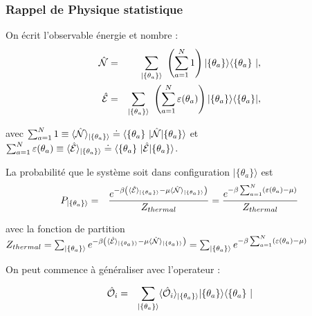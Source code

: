 \subsubsection{Rappel de Physique statistique}

On écrit l'observable énergie et nombre :
	\begin{eqnarray}
		\operator{\mathcal{N}} & = & \sum_{\vert \{\theta_a\} \rangle }   \left ( \sum_{a = 1}^N  1 \right )  \vert \{ \theta_a\}\rangle	\langle \{ \theta_a \} \vert,\\
		\operator{\mathcal{E}} & = & \sum_{ \vert \{ \theta_a\} \rangle }  \left ( \sum_{a = 1}^N  \varepsilon ( \theta_a ) \right )   \vert \{ \theta_a\}\rangle	\langle \{ \theta_a \}\vert,		
	\end{eqnarray}
	
	avec $\sum_{a = 1}^N 1 \equiv \langle \operator{\mathcal{N}} \rangle_{\vert \{\theta_a \} \rangle}  \doteq  \langle \{ \theta_a \} \vert  \operator{\mathcal{N}}  \vert \{ \theta_a\}\rangle  $ et $  \sum_{a = 1}^N  \varepsilon ( \theta_a ) \equiv \langle \operator{\mathcal{E}} \rangle_{\vert \{\theta_a \} \rangle}  \doteq  \langle \{ \theta_a \} \vert  \operator{ \mathcal{E}}  \vert \{ \theta_a\}\rangle $.

	
	La probabilité que le système soit dans configuration $\vert \{ \theta_a \}\rangle $  est 
	\begin{eqnarray}
		P_{\vert \{\theta_a \} \rangle} & = & \frac{e^{- \beta \left ( \langle \hat{\mathbf{\mathcal{E}}} \rangle_{\vert \{\theta_a \} \rangle}   - \mu \langle \hat{\mathbf{\mathcal{N}}} \rangle_{\vert \{\theta_a \} \rangle} \right )}}{Z_{thermal}} = \frac{e^{- \beta \sum_{a=1}^N  ( \varepsilon( \theta_a )   - \mu  )}}{Z_{thermal}}	
	\end{eqnarray}
	
	avec la fonction de partition $Z_{thermal} = \sum_{ \vert \{ \theta_a\} \rangle }e^{- \beta \left ( \langle \hat{\mathbf{\mathcal{E}}} \rangle_{\vert \{\theta_a \} \rangle}   - \mu \langle \hat{\mathbf{\mathcal{N}}} \rangle_{\vert \{\theta_a \} \rangle} \right )} = \sum_{ \vert \{ \theta_a\} \rangle } e^{- \beta \sum_{a=1}^N  ( \varepsilon( \theta_a )   - \mu  )}$
	
	On peut commence à généraliser avec l'operateur :
	
	
	\begin{eqnarray}
		\operator{\mathcal{O}}_i & = & \sum_{\vert \{\theta_a \} \rangle} \langle \operator{\mathcal{O}}_i \rangle_{\vert \{\theta_a \} \rangle}  \vert \{ \theta_a\}\rangle	\langle \{ \theta_a \} \vert
	\end{eqnarray}
	

